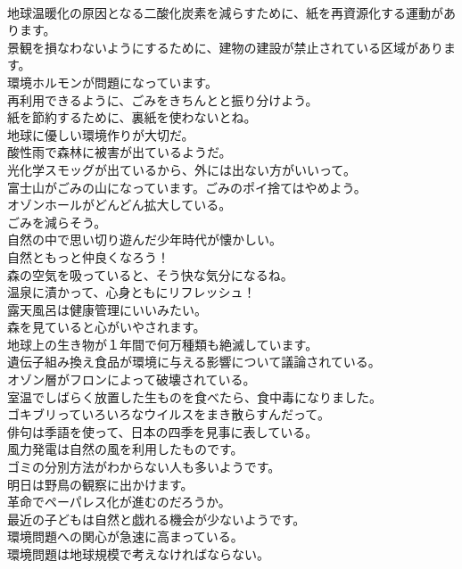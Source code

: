 \documentclass[8pt]{extreport}
\begin{document}
\begin{CJK}{UTF8}{min}
\\	地球温暖化の原因となる二酸化炭素を減らすために、紙を再資源化する運動があります。	
\\	景観を損なわないようにするために、建物の建設が禁止されている区域があります。	
\\	環境ホルモンが問題になっています。	
\\	再利用できるように、ごみをきちんとと振り分けよう。	
\\	紙を節約するために、裏紙を使わないとね。	
\\	地球に優しい環境作りが大切だ。	
\\	酸性雨で森林に被害が出ているようだ。	
\\	光化学スモッグが出ているから、外には出ない方がいいって。	
\\	富士山がごみの山になっています。ごみのポイ捨てはやめよう。	
\\	オゾンホールがどんどん拡大している。	
\\	ごみを減らそう。	
\\	自然の中で思い切り遊んだ少年時代が懐かしい。	
\\	自然ともっと仲良くなろう！	
\\	森の空気を吸っていると、そう快な気分になるね。	
\\	温泉に漬かって、心身ともにリフレッシュ！	
\\	露天風呂は健康管理にいいみたい。	
\\	森を見ていると心がいやされます。	
\\	地球上の生き物が１年間で何万種類も絶滅しています。	
\\	遺伝子組み換え食品が環境に与える影響について議論されている。	
\\	オゾン層がフロンによって破壊されている。	
\\	室温でしばらく放置した生ものを食べたら、食中毒になりました。	
\\	ゴキブリっていろいろなウイルスをまき散らすんだって。	
\\	俳句は季語を使って、日本の四季を見事に表している。	
\\	風力発電は自然の風を利用したものです。	
\\	ゴミの分別方法がわからない人も多いようです。	
\\	明日は野鳥の観察に出かけます。	
\\	革命でペーパレス化が進むのだろうか。	
\\	最近の子どもは自然と戯れる機会が少ないようです。	
\\	環境問題への関心が急速に高まっている。	
\\	環境問題は地球規模で考えなければならない。	

\end{CJK}
\end{document}
